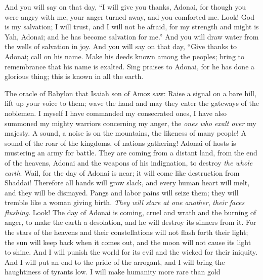 \begin{biblechapter} %
 And you will say on that day, 
“I will give you thanks, Adonai, 
for though you were angry with me, 
your anger turned away, 
and you comforted me.
\verse Look! God is my salvation; 
I will trust, and I will not be afraid, 
for my strength and might is Yah, Adonai; 
and he has become salvation for me.”
\verse And you will draw water from the wells of salvation in joy.
\verse And you will say on that day,
\verse “Give thanks to Adonai; 
call on his name. 
Make his deeds known among the peoples; 
bring to remembrance that his name is exalted.
\verse Sing praises to Adonai, for he has done a glorious thing; 
this is known in all the earth.
\end{biblechapter}

\begin{biblechapter} %
 The oracle of Babylon that Isaiah son of Amoz saw:
\verse Raise a signal on a bare hill, 
lift up your voice to them; 
wave the hand and may they enter the gateways of the noblemen.
\verse I myself I have commanded my consecrated ones, 
I have also summoned my mighty warriors concerning my anger, 
the \textit{ones who exalt over} my majesty.
\verse A sound, a noise is on the mountains, 
the likeness of many people! 
A sound of the roar of the kingdoms, 
of nations gathering! 
Adonai of hosts is mustering an army for battle.
\verse They are coming from a distant land, 
from the end of the heavens, 
Adonai and the weapons of his indignation, 
to destroy \textit{the whole earth}.
\verse Wail, for the day of Adonai is near; 
it will come like destruction from Shaddai!
\verse Therefore all hands will grow slack, 
and every human heart will melt,
\verse and they will be dismayed. 
Pangs and labor pains will seize them; 
they will tremble like a woman giving birth. 
\textit{They will stare at one another}, 
\textit{their faces flushing}.
\verse Look! The day of Adonai is coming, 
cruel and wrath and the burning of anger, 
to make the earth a desolation, 
and he will destroy its sinners from it.
\verse For the stars of the heavens and their constellations will not flash forth their light; 
the sun will keep back when it comes out, 
and the moon will not cause its light to shine.
\verse And I will punish the world for its evil 
and the wicked for their iniquity. 
And I will put an end to the pride of the arrogant, 
and I will bring the haughtiness of tyrants low.
\verse I will make humanity more rare than gold 

\end{biblechapter}
